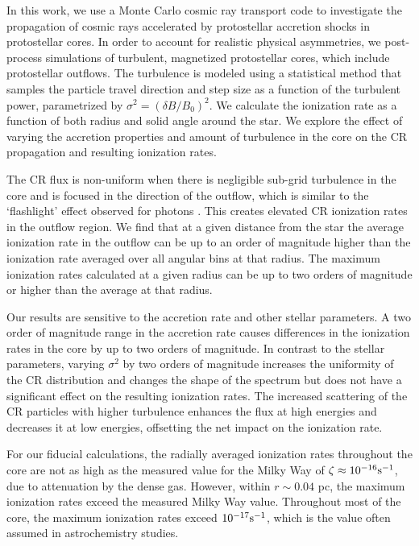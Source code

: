 \documentclass[twocolumn]{aastex63}
\begin{document}
In this work, we use a Monte Carlo cosmic ray transport code to investigate the propagation of cosmic rays accelerated by protostellar accretion shocks in protostellar cores. In order to account for realistic physical asymmetries, we post-process simulations of turbulent, magnetized protostellar cores, which include protostellar outflows. The turbulence is modeled using a statistical method that samples the particle travel direction and step size as a function of the turbulent power, parametrized by $\sigma^2=(\delta B/B_0)^2$. We calculate the ionization rate as a function of both radius and solid angle around the star. We explore the effect of varying the accretion properties and amount of turbulence in the core on the CR propagation and resulting ionization rates.  

The CR flux is non-uniform when there is negligible sub-grid turbulence in the core and is focused in the direction of the outflow, which is similar to the `flashlight' effect observed for photons \citep{yorke_2002_stars, cunningham_2011_outflows}. This creates elevated CR ionization rates in the outflow region. We find that at a given distance from the star the average ionization rate in the outflow can be up to an order of magnitude higher than the ionization rate averaged over all angular bins at that radius. The maximum ionization rates calculated at a given radius can be up to two orders of magnitude or higher than the average at that radius. 

Our results are sensitive to the accretion rate and other stellar parameters. A two order of magnitude range in the accretion rate causes differences in the ionization rates in the core by up to two orders of magnitude. In contrast to the stellar parameters, varying $\sigma^2$ by two orders of magnitude increases the uniformity of the CR distribution and changes the shape of the spectrum but does not have a significant effect on the resulting ionization rates. The increased scattering of the CR particles with higher turbulence enhances the flux at high energies and decreases it at low energies, offsetting the net impact on the ionization rate. 

For our fiducial calculations, the radially averaged ionization rates throughout the core are not as high as the measured value for the Milky Way of $\zeta \approx 10^{-16} \rm s^{-1}$, due to attenuation by the dense gas. However, within $r \sim 0.04$ pc, the maximum ionization rates exceed the measured Milky Way value. Throughout most of the core, the maximum ionization rates exceed $10^{-17} \rm s^{-1}$, which is the value often assumed in astrochemistry studies. 
\end{document}
